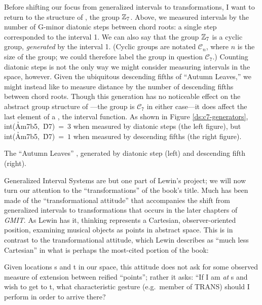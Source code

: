 \documentclass[diss]{subfiles}
\begin{document}
Before shifting our focus from generalized intervals to transformations, I
want to return to the structure of \ivls{}, the group $\mathbb{Z}_7$. Above, we
measured intervals by the number of G-minor diatonic steps between chord
roots: a single step corresponded to the interval 1. We can also say that the
group $\mathbb{Z}_7$ is a cyclic group, \emph{generated} by the interval 1. (Cyclic
groups are notated $\mathcal{C}_n$, where $n$ is the size of the group; we
could therefore label the group in question $\mathcal{C}_7$.) Counting
diatonic steps is not the only way we might consider measuring intervals in
the space, however. Given the ubiquitous descending fifths of “Autumn Leaves,”
we might instead like to measure distance by the number of descending fifths
between chord roots. Though this generation has no noticeable effect on the
abstract group structure of \ivls{}---the group is $\mathcal{C}_7$ in either
case---it does affect the last element of a \gis{}, the interval
function. As shown in Figure \ref{ds:c7-generators},
\mbox{int(\h{Am7b5}, \h{D7}) = $3$} when measured by diatonic steps (the left
figure), but \mbox{int(\h{Am7b5}, \h{D7}) = $1$} when measured by descending fifths
(the right figure).

\figBeg
  \caption[The “Autumn Leaves” \gis{}, generated by diatonic step and descending
    fifth.]{The “Autumn Leaves” \gis{}, generated by diatonic step (left) and
    descending fifth (right).}
  \label{ds:c7-generators}
\figEnd

Generalized Interval Systems are but one part of Lewin’s project; we will now
turn our attention to the “transformations” of the book’s title. Much has been
made of the “transformational attitude” that accompanies the shift from
generalized intervals to transformations that occurs in the later chapters of
\emph{GMIT}. As Lewin has it, \gis{} thinking represents a Cartesian,
observer-oriented position, examining musical objects as points in abstract
space. This is in contrast to the transformational attitude, which Lewin
describes as “much less Cartesian” in what is perhaps the most-cited portion
of the book:
\begin{quoting}
  \singlespacing
  Given locations s and t in our space, this attitude does not ask for some
  observed measure of extension between reified “points”; rather it asks: “If
  I am \emph{at} s and wish to get to t, what characteristic gesture
  (e.g.~member of TRANS) should I perform in order to arrive
  there?
\end{quoting}
\end{document}
